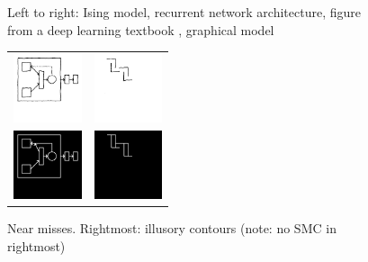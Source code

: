 \documentclass{article}
\theoremstyle{definition}
\begin{document}
\begin{figure}[H]
\begin{minipage}[t]{9cm}
\begin{tabular}{llll}
      \end{tabular}
    \caption{Left to right: Ising model, recurrent network architecture, figure from a deep learning textbook \cite{Goodfellow-et-al-2016}, graphical model}\label{drawingSuccesses}
  \end{minipage}
\hfill  \begin{minipage}[t]{4.25cm}
    \begin{tabular}{ll}
          \includegraphics[width = 2cm]{figures/expert-1.png}&
          \includegraphics[width = 2cm]{figures/expert-34.png}\\
      \includegraphics[width = 2cm]{figures/expert-1-parse.png}     &
              \includegraphics[width = 2cm]{figures/34-parse.png}    
    \end{tabular}


    \caption{Near misses. Rightmost: illusory contours (note: no SMC in rightmost)}\label{drawingFailures}
  \end{minipage}


\end{figure}
\setlength\tabcolsep{6pt}
\end{document}
